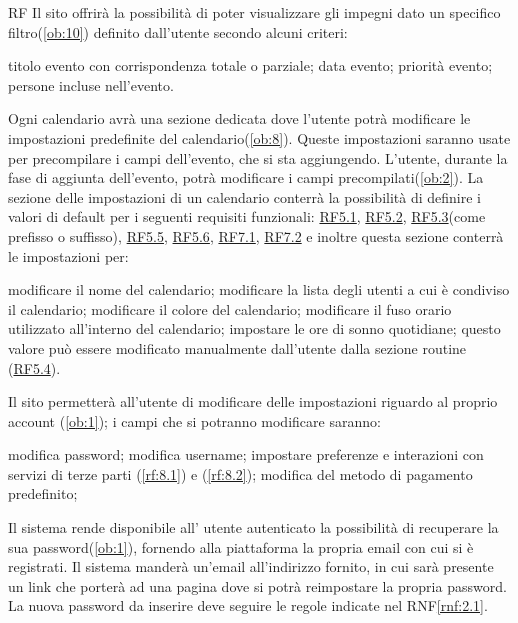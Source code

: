 \begin{listaPersonale}{RF}
	 Il sito offrirà la possibilità di poter visualizzare gli impegni dato un specifico filtro(\ref{ob:10}) definito dall'utente secondo alcuni criteri:
	\begin{listaPersonale2}{}
		 titolo evento con corrispondenza totale o parziale;
		 data evento;
		 priorità evento;
		 persone incluse nell'evento.
	\end{listaPersonale2}

	 Ogni calendario avrà una sezione dedicata dove l'utente potrà modificare le impostazioni predefinite del calendario(\ref{ob:8}). Queste impostazioni saranno usate per precompilare i campi dell'evento, che si sta aggiungendo. L'utente, durante la fase di aggiunta dell'evento, potrà modificare i campi precompilati(\ref{ob:2}). La sezione delle impostazioni di un calendario conterrà la possibilità di definire i valori di default per i seguenti requisiti funzionali: \hyperref[rf:5.1]{RF5.1}, \hyperref[rf:5.2]{RF5.2}, \hyperref[rf:5.3]{RF5.3}(come prefisso o suffisso), \hyperref[rf:5.5]{RF5.5}, \hyperref[rf:5.6]{RF5.6}, \hyperref[rf:7.1]{RF7.1}, \hyperref[rf:7.2]{RF7.2} e inoltre questa sezione conterrà le impostazioni per:
	\begin{listaPersonale2}{}
		 modificare il nome del calendario;
		 modificare la lista degli utenti a cui è condiviso il calendario;
		 modificare il colore del calendario;
		 modificare il fuso orario utilizzato all'interno del calendario;
		 impostare le ore di sonno quotidiane; questo valore può essere modificato manualmente dall'utente dalla sezione routine (\hyperref[rf:5.4]{RF5.4}). 
	\end{listaPersonale2}

	 Il sito permetterà all'utente di modificare delle impostazioni riguardo al proprio account (\ref{ob:1}); i campi che si potranno modificare saranno:
	\begin{listaPersonale2}{}
		 modifica password;
		 modifica username;
		 impostare preferenze e interazioni con servizi di terze parti (\ref{rf:8.1}) e (\ref{rf:8.2});
		 modifica del metodo di pagamento predefinito;
		

	\end{listaPersonale2}

	Il sistema rende disponibile all’ utente autenticato la possibilità di recuperare la sua password(\ref{ob:1}), fornendo alla piattaforma la propria email con cui si è registrati. Il sistema manderà un’email all'indirizzo fornito, in cui sarà presente un link che porterà ad una pagina dove si potrà reimpostare la propria password. La nuova password da inserire deve seguire le regole indicate nel RNF\ref{rnf:2.1}. %
\end{listaPersonale}
